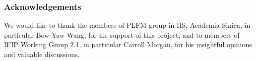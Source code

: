 \documentclass[runningheads]{llncs}
\begin{document}
\subsubsection{Acknowledgements}
We would like to thank the members of PLFM group in IIS, Academia Sinica,
in particular Bow-Yaw Wang, for his support of this project,
and to members of IFIP Working Group 2.1, in particular Carroll Morgan,
for his insightful opinions and valuable discussions.



%
\end{document}
